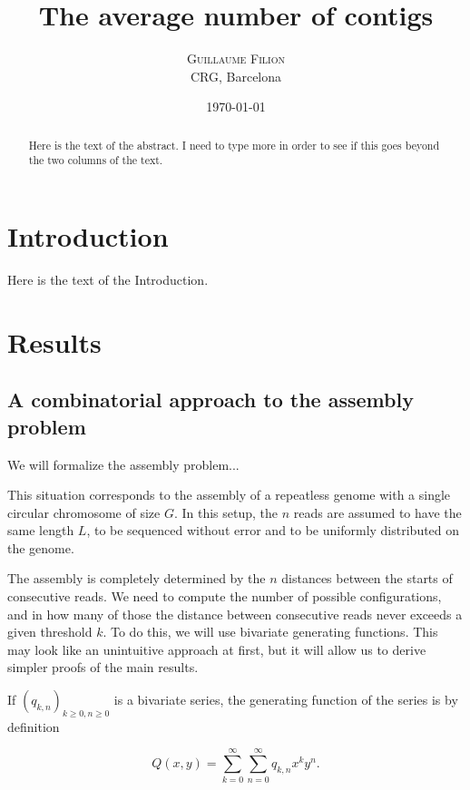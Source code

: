 \documentclass{article}
\title{The average number of contigs}
\author{
\textsc{Guillaume Filion} \\ [1ex]
\normalsize CRG, Barcelona
}
\date{\today}
\begin{document}
\maketitle

\begin{abstract}
Here is the text of the abstract. I need to type more in order to see if
this goes beyond the two columns of the text.
\end{abstract}



\section{Introduction}

Here is the text of the Introduction.

\section{Results}

\subsection{A combinatorial approach to the assembly problem}

We will formalize the assembly problem...

This situation corresponds to the assembly of a repeatless genome with a
single circular chromosome of size $G$. In this setup, the $n$ reads are
assumed to have the same length $L$, to be sequenced without error  and to
be uniformly distributed on the genome.

The assembly is completely determined by the $n$ distances between the
starts of consecutive reads. We need to compute the number of possible
configurations, and in how many of those the distance between consecutive
reads never exceeds a given threshold $k$. To do this, we will use
bivariate generating functions. This may look like an unintuitive approach
at first, but it will allow us to derive simpler proofs of the main
results.

If $(q_{k,n})_{k \geq 0, n \geq 0}$ is a bivariate series, the generating
function of the series is by definition

\begin{equation}
Q(x,y) = \sum_{k=0}^\infty \sum_{n=0}^\infty q_{k,n}x^ky^n.
\end{equation}
\end{document}
